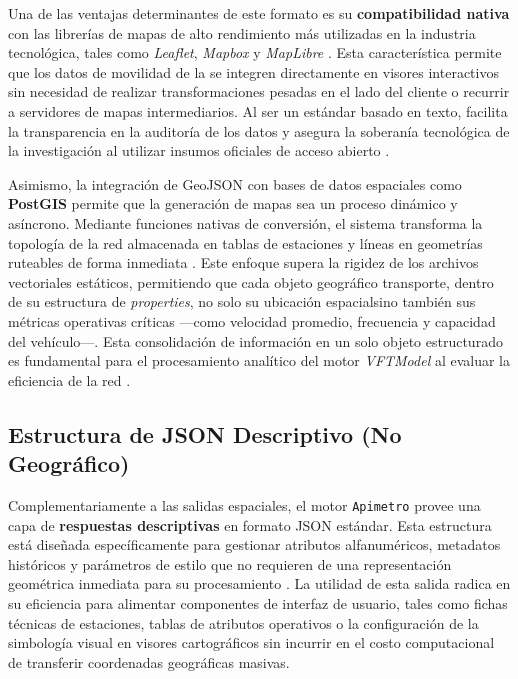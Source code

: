 Una de las ventajas determinantes de este formato es su \textbf{compatibilidad nativa} con las librerías de mapas de alto rendimiento más utilizadas en la industria tecnológica, tales como \textit{Leaflet}, 
\textit{Mapbox} y \textit{MapLibre} \parencite{cabrera2025apimetro}. Esta característica permite que los datos de movilidad de la \zmvm se integren directamente en visores interactivos sin necesidad de 
realizar transformaciones pesadas en el lado del cliente o recurrir a servidores de mapas intermediarios. Al ser un estándar basado en texto, facilita la transparencia en la auditoría de los datos y 
asegura la soberanía tecnológica de la investigación al utilizar insumos oficiales de acceso abierto \parencite{adip_gtfs_2024}.

Asimismo, la integración de GeoJSON con bases de datos espaciales como \textbf{PostGIS} permite que la generación de mapas sea un proceso dinámico y asíncrono. Mediante funciones nativas de conversión, el sistema 
transforma la topología de la red almacenada en tablas de estaciones y líneas en geometrías ruteables de forma inmediata \parencite{fortin2016innovative}. 
Este enfoque supera la rigidez de los archivos vectoriales estáticos, permitiendo que cada objeto geográfico transporte, dentro de su estructura de \textit{properties}, no solo su ubicación espacial\DIFaddbegin \DIFadd{, }\DIFaddend sino
también sus métricas operativas críticas —como velocidad promedio, frecuencia y capacidad del vehículo—. Esta consolidación de información en un solo objeto estructurado es fundamental para el procesamiento 
analítico del motor \textit{VFTModel} al evaluar la eficiencia de la red \parencite{cabrera2026VFTModel}.

\subsection{Estructura de JSON Descriptivo (No Geográfico)}
\label{subsec:estructura-geojson-descriptivo}

Complementariamente a las salidas espaciales, el motor \texttt{Apimetro} provee una capa de \textbf{respuestas descriptivas} en formato JSON estándar. Esta estructura está diseñada específicamente para gestionar atributos 
alfanuméricos, metadatos históricos y parámetros de estilo que no requieren de una representación geométrica inmediata para su procesamiento \parencite{cabrera2025apimetro}. 
La utilidad de esta salida radica en su eficiencia para alimentar componentes de interfaz de usuario, tales como fichas técnicas de estaciones, tablas de atributos operativos o la configuración de la simbología visual 
en visores cartográficos sin incurrir en el costo computacional de transferir coordenadas geográficas masivas.


